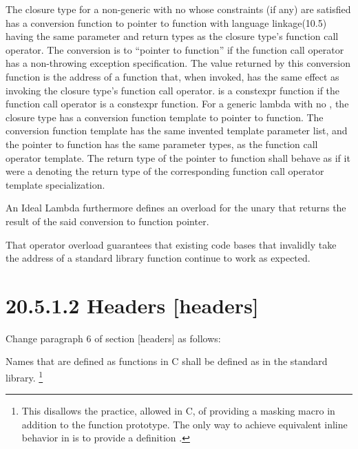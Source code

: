 \documentclass[ebook,11pt,article]{memoir}
\begin{document}
\pnum
The closure type for a non-generic  with no
whose constraints (if any) are satisfied
has a conversion function to pointer to
function with \Cpp{} language linkage(10.5) %
having
the same parameter and return types as the closure type's function call operator.
The conversion is to ``pointer to  function''
if the function call operator
has a non-throwing exception specification.
The value returned by this conversion function
is the address of a function  that, when invoked,
has the same effect as invoking the closure type's function call operator.
 is a constexpr function
if the function call operator is a constexpr function.
For a generic lambda with no , the closure type has a
conversion function template to
pointer to function. The conversion function template has the same invented
template parameter list, and the pointer to function has the same
parameter types, as the function call operator template.  The return type of
the pointer to function shall behave as if it were a
 denoting the return type of the corresponding
function call operator template specialization.
\begin{addedblock}
An Ideal Lambda furthermore defines an overload for the unary  that returns the result of the said conversion to function pointer. 
\begin{note}
That operator overload guarantees that existing code bases that invalidly take the address of a standard library function continue to work as expected.
\end{note}
\end{addedblock}

\section{20.5.1.2 Headers [headers]}
Change paragraph 6 of section [headers] as follows:

Names that are defined as functions in C shall be defined as  in the
\Cpp{} standard library. \footnote{This disallows the practice, allowed in C, of
providing a masking macro in addition to the function prototype. The only way to
achieve equivalent inline behavior in \Cpp{} is to provide a definition .}
\end{document}
